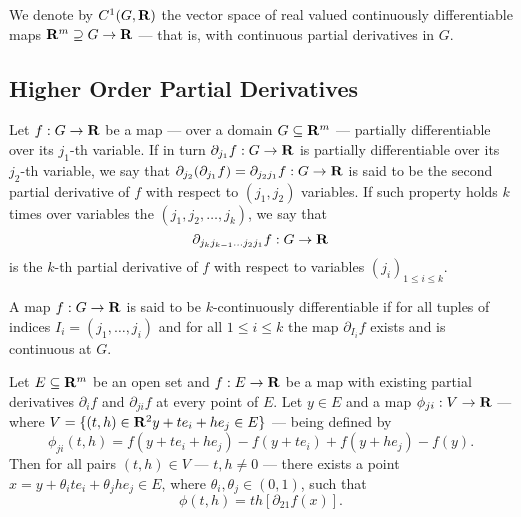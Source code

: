 \begin{definition}
    We denote by \(C^1(G, \mathbf{R})\) the vector space of real valued continuously
    differentiable maps \(\mathbf{R}^m \supseteq G \to \mathbf{R}\) --- that is, with continuous
    partial derivatives in \(G\).
\end{definition}

\subsection{Higher Order Partial Derivatives}

\begin{definition}
    \label{def: kth-partial}
    Let \(f: G \to \mathbf{R}\) be a map --- over a domain \(G \subseteq \mathbf{R}^m\) ---
    partially differentiable over its \(j_1\)-th variable. If in turn
    \(\partial_{j_1} f: G \to \mathbf{R}\) is partially differentiable over its \(j_2\)-th
    variable, we say that \(\partial_{j_2}(\partial_{j_1} f) = \partial_{j_2 j_1}
    f: G \to \mathbf{R}\) is said to be the second partial derivative of \(f\) with
    respect to \((j_1, j_2)\) variables. If such property holds \(k\) times over
    variables the \((j_1, j_2, \dots, j_k)\), we say that
    \[
        \partial_{j_k j_{k-1} \dots j_2 j_1} f: G \to \mathbf{R}
    \]
    is the \(k\)-th partial derivative of \(f\) with respect to variables
    \((j_i)_{1 \leq i \leq k}\).
\end{definition}

\begin{definition}
    A map \(f: G \to \mathbf{R}\) is said to be \(k\)-continuously differentiable if for
    all tuples of indices \(I_i = (j_1, \dots, j_i)\) and for all \(1 \leq i \leq
    k\) the map \(\partial_{I_i} f\) exists and is continuous at \(G\).
\end{definition}

\begin{lemma}\label{lem: order-var-partial}
    Let \(E \subseteq \mathbf{R}^m\) be an open set and \(f: E \to \mathbf{R}\) be a map with
    existing partial derivatives \(\partial_i f\) and \(\partial_{ji} f\) at every
    point of \(E\). Let \(y \in E\) and a map \(\phi_{ji}: V \to \mathbf{R}\) --- where
    \(V = \{(t, h) \in \mathbf{R}^2 \relax y + t e_i + h e_j \in E\} \) --- being defined by
    \[
        \phi_{ji}(t, h) = f(y + t e_i + h e_j) - f(y + t e_i) + f(y + h e_j) - f(y).
    \]
    Then for all pairs \((t, h) \in V\) --- \(t, h \neq 0\) --- there exists a
    point \(x = y + \theta_i t e_i + \theta_j h e_j \in E\), where \(\theta_i,
    \theta_j \in (0, 1)\), such that
    \[
        \phi(t, h) = t h [\partial_{2 1} f(x)].
    \]
\end{lemma}

